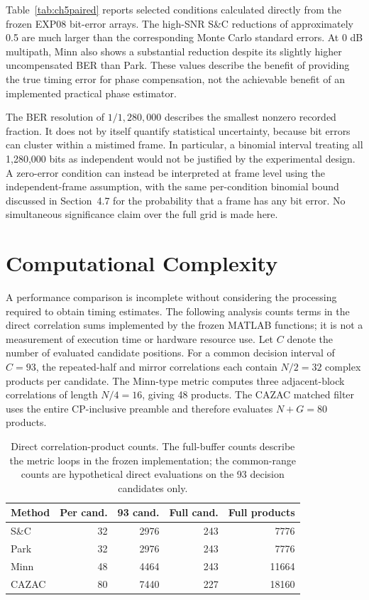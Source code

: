 Table~\ref{tab:ch5paired} reports selected conditions calculated directly from the frozen EXP08 bit-error arrays. The high-SNR S\&C reductions of approximately 0.5 are much larger than the corresponding Monte Carlo standard errors. At 0 dB multipath, Minn also shows a substantial reduction despite its slightly higher uncompensated BER than Park. These values describe the benefit of providing the true timing error for phase compensation, not the achievable benefit of an implemented practical phase estimator.

The BER resolution of $1/1{,}280{,}000$ describes the smallest nonzero recorded fraction. It does not by itself quantify statistical uncertainty, because bit errors can cluster within a mistimed frame. In particular, a binomial interval treating all 1,280,000 bits as independent would not be justified by the experimental design. A zero-error condition can instead be interpreted at frame level using the independent-frame assumption, with the same per-condition binomial bound discussed in Section~4.7 for the probability that a frame has any bit error. No simultaneous significance claim over the full grid is made here.

\section[Computational Complexity]{Computational Complexity}
\label{sec:ch5complexity}
A performance comparison is incomplete without considering the processing required to obtain timing estimates. The following analysis counts terms in the direct correlation sums implemented by the frozen MATLAB functions; it is not a measurement of execution time or hardware resource use. Let $C$ denote the number of evaluated candidate positions. For a common decision interval of $C=93$, the repeated-half and mirror correlations each contain $N/2=32$ complex products per candidate. The Minn-type metric computes three adjacent-block correlations of length $N/4=16$, giving 48 products. The CAZAC matched filter uses the entire CP-inclusive preamble and therefore evaluates $N+G=80$ products.

\begin{table}[!htbp]
\centering\small
\caption[Direct correlation workload.]{Direct correlation-product counts. The full-buffer counts describe the metric loops in the frozen implementation; the common-range counts are hypothetical direct evaluations on the 93 decision candidates only.}
\label{tab:ch5complexity}
\begin{tabular}{lrrrr}\hline
Method&Per cand.&93 cand.&Full cand.&Full products\\\hline
S\&C&32&2976&243&7776\\
Park&32&2976&243&7776\\
Minn&48&4464&243&11664\\
CAZAC&80&7440&227&18160\\\hline
\end{tabular}
\end{table}


